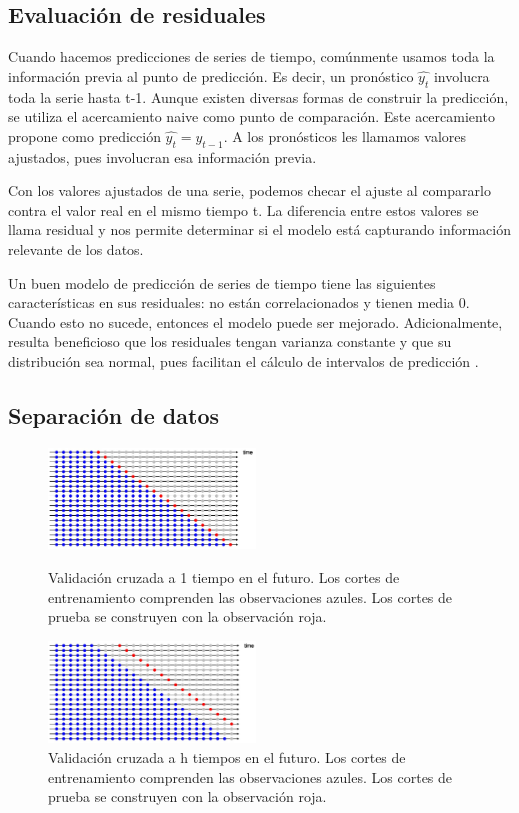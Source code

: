 \subsection{Evaluación de residuales}

Cuando hacemos predicciones de series de tiempo, comúnmente usamos toda la información previa al punto de predicción. Es decir, un pronóstico $\hat{y_t}$ involucra toda la serie hasta t-1. Aunque existen diversas formas de construir la predicción, se utiliza el acercamiento naive como punto de comparación. Este acercamiento propone como predicción $\hat{y_t}=y_{t-1}$. A los pronósticos les llamamos valores ajustados, pues involucran esa información previa.

Con los valores ajustados de una serie, podemos checar el ajuste al compararlo contra el valor real en el mismo tiempo t. La diferencia entre estos valores se llama residual y nos permite determinar si el modelo está capturando información relevante de los datos.

Un buen modelo de predicción de series de tiempo tiene las siguientes características en sus residuales: no están correlacionados y tienen media 0. Cuando esto no sucede, entonces el modelo puede ser mejorado. Adicionalmente, resulta beneficioso que los residuales tengan varianza constante y que su distribución sea normal, pues facilitan el cálculo de intervalos de predicción \cite{hyndman2018forecasting}.

\subsection{Separación de datos}


    \begin{figure}[t]
    \centering

      \includegraphics[width=55mm]{imgs/train_cv1.jpg}
      \caption{Validación cruzada a 1 tiempo en el futuro. Los cortes de entrenamiento comprenden las observaciones azules. Los cortes de prueba se construyen con la observación roja.}
      \label{fig:train_cv1}

      \includegraphics[width=55mm]{imgs/train_cv2.jpg}
      \caption{Validación cruzada a h tiempos en el futuro. Los cortes de entrenamiento comprenden las observaciones azules. Los cortes de prueba se construyen con la observación roja.}
       \label{fig:train_cv2}

    \end{figure}
    
